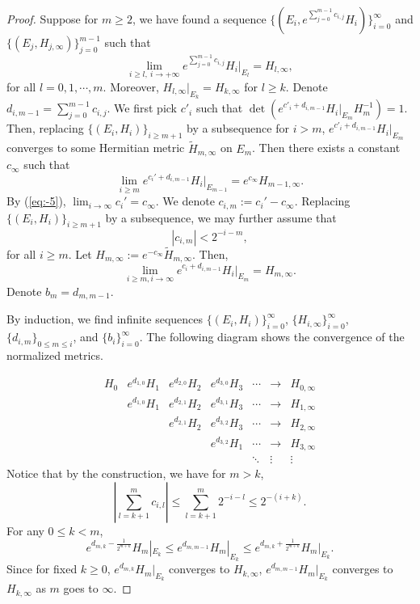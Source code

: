 \documentclass[10pt,a4paper]{amsart}
\begin{document}
\begin{proof}
Suppose for $m\geq2$, we have found a sequence $\{(E_{i},e^{\sum_{j=0}^{m-1}c_{i,j}}H_{i})\}_{i=0}^\infty$
and $\{(E_{j},H_{j,\infty})\}_{j=0}^{m-1}$ such that
\begin{equation}
\lim_{i\geq l,\ i\to+\infty}e^{\sum_{j=0}^{m-1}c_{i,j}}H_{i}|_{E_{l}}=H_{l,\infty},\label{eq:-5}
\end{equation}
for all $l=0,1,\cdots,m$. Moreover, $H_{l,\infty}|_{E_{k}}=H_{k,\infty}$
for $l\geq k$. Denote $d_{i,m-1}=\sum_{j=0}^{m-1}c_{i,j}$. We first
pick $c'_{i}$ such that $\det(e^{c'_{i}+d_{i,m-1}}H_{i}|_{E_{m}}H_{m}^{-1})=1$.
Then, replacing $\{(E_{i},H_{i})\}_{i\geq m+1}$ by a subsequence
for $i>m$, $e^{c'_{i}+d_{i,m-1}}H_{i}|_{E_{m}}$ converges to some
Hermitian metric $\tilde{H}_{m,\infty}$ on $E_{m}$. Then there exists
a constant $c_{\infty}$ such that 
\[
\lim_{i\geq m}e^{c_{i}'+d_{i,m-1}}H_{i}|_{E_{m-1}}=e^{c_{\infty}}H_{m-1,\infty}.
\]
By (\ref{eq:-5}), $\lim_{i\to\infty}c_{i}'=c_{\infty}$. We denote
$c_{i,m}:=c_{i}'-c_{\infty}$. Replacing $\{(E_{i},H_{i})\}_{i\geq m+1}$
by a subsequence, we may further assume that 
\begin{equation}
|c_{i,m}|<2^{-i-m},\label{eq:-7}
\end{equation}
 for all $i\geq m$. Let $H_{m,\infty}:=e^{-c_{\infty}}\tilde{H}_{m,\infty}$.
Then, 
\[
\lim_{i\geq m,i\to\infty}e^{c_{i}+d_{i,m-1}}H_{i}|_{E_{m}}=H_{m,\infty}.
\]
Denote $b_{m}=d_{m,m-1}$. 

By induction, we find infinite sequences $\{(E_{i},H_{i})\}_{i=0}^{\infty}$,
$\{H_{i,\infty}\}_{i=0}^{\infty}$, $\{d_{i,m}\}_{0\leq m\leq i}$,
and $\{b_{i}\}_{i=0}^{\infty}$. The following diagram shows the convergence
of the normalized metrics. 

\[
\begin{array}{ccccccc}
H_{0} & e^{d_{1,0}}H_{1} & e^{d_{2,0}}H_{2} & e^{d_{3,0}}H_{3} & \cdots & \to & H_{0,\infty}\\
 & e^{d_{1,0}}H_{1} & e^{d_{2,1}}H_{2} & e^{d_{3,1}}H_{3} & \cdots & \to & H_{1,\infty}\\
 &  & e^{d_{2,1}}H_{2} & e^{d_{3,2}}H_{3} & \cdots & \to & H_{2,\infty}\\
 &  &  & e^{d_{3,2}}H_{1} & \cdots & \to & H_{3,\infty}\\
 &  &  &  & \ddots & \vdots & \vdots
\end{array}
\]
Notice that by the construction, we have for $m>k$,
\[
\left|\sum_{l=k+1}^{m}c_{i,l}\right|\leq\sum_{l=k+1}^{m}2^{-i-l}\leq2^{-(i+k)}.
\]
For any $0\leq k<m$,
\begin{equation}
e^{d_{m,k}-\frac{1}{2^{m+k}}}H_{m}|_{E_{k}}\leq e^{d_{m,m-1}}H_{m}|_{E_{k}}\leq e^{d_{m,k}+\frac{1}{2^{m+k}}}H_{m}|_{E_{k}}.\label{eq:-6}
\end{equation}
Since for fixed $k\geq0$, $e^{d_{m,k}}H_{m}|_{E_{k}}$ converges
to $H_{k,\infty}$, $e^{d_{m,m-1}}H_{m}|_{E_{k}}$ converges to $H_{k,\infty}$
as $m$ goes to $\infty$. 


\end{proof}
\end{document}
